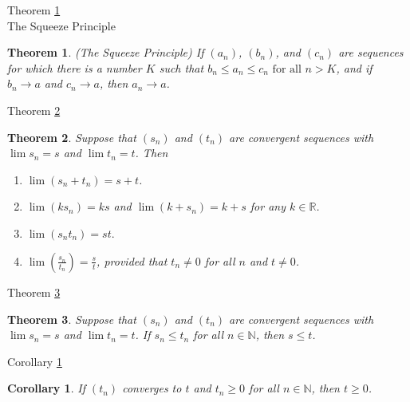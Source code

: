 \documentclass[avery5371,grid]{flashcards}
\newtheorem{corollary}{Corollary}
\newtheorem{theorem}{Theorem}
\newcommand{\bb}[1]{\mathbb{#1}}
\newcommand{\R}{\bb{R}}
\newcommand{\N}{\bb{N}}
\begin{document}
\begin{flashcard}[Theorem]{Theorem \ref{thm52} \\ The Squeeze Principle}
\begin{theorem}
\label{thm52}
(The Squeeze Principle)  If $(a_n)$, $(b_n)$, and $(c_n)$ are sequences
for which there is a number $K$ such that $b_n \leq a_n \leq c_n
\mbox{ for all } n > K$, and if $b_n \to a$ and $c_n \to a$, then
$a_n \to a$.
\end{theorem}
\end{flashcard}

\begin{flashcard}[Theorem]{Theorem \ref{thm53}}
\begin{theorem}
\label{thm53}
Suppose that $(s_n)$ and $(t_n)$ are convergent sequences with
$\lim s_n = s$ and $\lim t_n = t$.  Then
\begin{enumerate}
\item $\lim (s_n + t_n) = s+t$.
\item $\lim (ks_n) = ks$ and $\lim (k+s_n) = k+s$ for any $k\in \R$.
\item $\lim (s_nt_n) = st.$
\item $\lim \left( \frac {s_n}{t_n} \right) = \frac st$, provided that
$t_n \not= 0$ for all $n$ and $t\not= 0$.
\end{enumerate}
\end{theorem}
\end{flashcard}

\begin{flashcard}[Theorem]{Theorem \ref{thm54}}
\begin{theorem}
\label{thm54}
Suppose that $(s_n)$ and $(t_n)$ are convergent sequences with
$\lim s_n = s$ and $\lim t_n = t$.  If $s_n \leq t_n$ for all $n \in
\N$, then $s \leq t$.
\end{theorem}
\end{flashcard}

\begin{flashcard}[Corollary]{Corollary \ref{cor03}}
\begin{corollary}
\label{cor03}
If $(t_n)$ converges to $t$ and $t_n \geq 0$ for all $n \in \N$, then
$t \geq 0$.
\end{corollary}
\end{flashcard}
\end{document}
